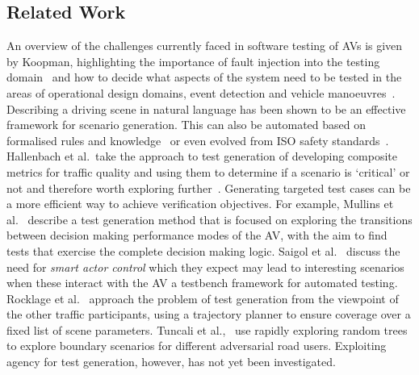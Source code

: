 \documentclass[letterpaper, 10 pt, journal, twoside]{IEEEtran}
\begin{document}
\subsection{Related Work}
An overview of the challenges currently faced in software testing of AVs is given by Koopman, highlighting the importance of fault injection into the testing domain~\cite{Koopman2016} and how to decide what aspects of the system need to be tested in the areas of operational design domains, event detection and vehicle manoeuvres~\cite{Koopman2019}. Describing a driving scene in natural language has been shown to be an effective framework for scenario generation. This can also be automated based on formalised rules and knowledge~\cite{Bagschik2018} or even evolved from ISO safety standards~\cite{Menzel2018}. Hallenbach et al.\ take the approach to test generation of developing composite metrics for traffic quality and using them to determine if a scenario is `critical' or not and therefore worth exploring further~\cite{Hallerbach2018}. Generating targeted test cases can be a more efficient way to achieve verification objectives. For example, Mullins et al.~\cite{Mullins2018} describe a test generation method that is focused on exploring the transitions between decision making performance modes of the AV, with the aim to find tests that exercise the complete decision making logic. Saigol et al.~\cite{Saigol2018} discuss the need for \textit{smart actor control} which they expect may lead to interesting scenarios when these interact with the AV a testbench framework for automated testing. Rocklage et al.~\cite{Rocklage2017} approach the problem of test generation from the viewpoint of the other traffic participants, using a trajectory planner to ensure coverage over a fixed list of scene parameters. Tuncali et al.,~\cite{Tuncali2019} use rapidly exploring random trees to explore boundary scenarios for different adversarial road users. Exploiting agency for test generation, however, has not yet been investigated. 
\end{document}
